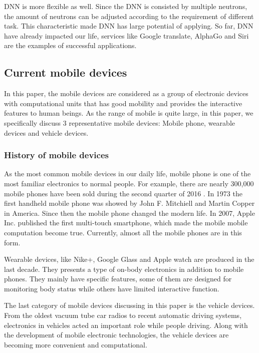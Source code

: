 \documentclass[article]{aaltoseries}
\begin{document}
DNN is more flexible as well. Since the DNN is consisted by multiple neutrons, the amount of neutrons can be adjusted
according to the requirement of different task. This characteristic made DNN has large potential of applying. So far, 
DNN have already impacted our life, services like Google translate, AlphaGo and Siri are the examples of successful applications.








\subsection{Current mobile devices} %

In this paper, the mobile devices are considered as a group of electronic devices with
computational units that has good mobility and provides the interactive features to human beings.
As the range of mobile is quite large, in this paper, we specifically discuss 3 representative 
mobile devices: Mobile phone, wearable devices and vehicle devices.




\subsubsection{History of mobile devices}

As the most common mobile devices in our daily life, mobile phone is one of the most familiar 
electronics to normal people. For example, there are nearly 300,000 mobile phones have been 
sold during the second quarter of 2016 \cite{moblePhoneSale}. In 1973 the first handheld mobile phone
was showed by John F. Mitchiell and Martin Copper in America. Since then the mobile phone 
changed the modern life. In 2007, Apple Inc. published the first multi-touch smartphone,
 which made the mobile mobile computation become true.
  Currently, almost all the mobile phones are in this form. 


Wearable devices, like Nike+, Google Glass and Apple watch are produced in the last decade. They presents
a type of on-body electronics in addition to mobile phones. They mainly have specific features, some of them
are designed for monitoring body status while others have limited interactive function.

The last category of mobile devices discussing in this paper is the vehicle devices. From the oldest vacuum tube
car radios to recent automatic driving systems, electronics in vehicles acted an important role while people
driving. Along with the development of mobile electronic technologies, the vehicle devices are becoming more convenient
and computational.
\end{document}
